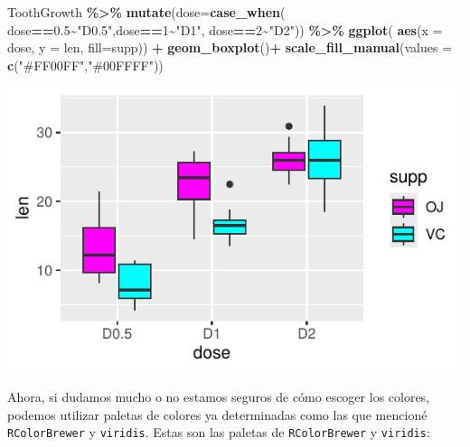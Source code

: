 \documentclass[
]{book}
\newenvironment{Shaded}{\begin{snugshade}}{\end{snugshade}}
\newcommand{\AttributeTok}[1]{\textcolor[rgb]{0.13,0.29,0.53}{#1}}
\newcommand{\DecValTok}[1]{\textcolor[rgb]{0.00,0.00,0.81}{#1}}
\newcommand{\FloatTok}[1]{\textcolor[rgb]{0.00,0.00,0.81}{#1}}
\newcommand{\FunctionTok}[1]{\textcolor[rgb]{0.13,0.29,0.53}{\textbf{#1}}}
\newcommand{\NormalTok}[1]{#1}
\newcommand{\SpecialCharTok}[1]{\textcolor[rgb]{0.81,0.36,0.00}{\textbf{#1}}}
\newcommand{\StringTok}[1]{\textcolor[rgb]{0.31,0.60,0.02}{#1}}
\begin{document}
\begin{Shaded}
\begin{Highlighting}[]
\NormalTok{ToothGrowth }\SpecialCharTok{\%\textgreater{}\%}  \FunctionTok{mutate}\NormalTok{(}\AttributeTok{dose=}\FunctionTok{case\_when}\NormalTok{(}
\NormalTok{  dose}\SpecialCharTok{==}\FloatTok{0.5}\SpecialCharTok{\textasciitilde{}}\StringTok{"D0.5"}\NormalTok{,dose}\SpecialCharTok{==}\DecValTok{1}\SpecialCharTok{\textasciitilde{}}\StringTok{"D1"}\NormalTok{, dose}\SpecialCharTok{==}\DecValTok{2}\SpecialCharTok{\textasciitilde{}}\StringTok{"D2"}\NormalTok{)) }\SpecialCharTok{\%\textgreater{}\%} \FunctionTok{ggplot}\NormalTok{(}
    \FunctionTok{aes}\NormalTok{(}\AttributeTok{x =}\NormalTok{ dose, }\AttributeTok{y =}\NormalTok{ len, }\AttributeTok{fill=}\NormalTok{supp)) }\SpecialCharTok{+}  \FunctionTok{geom\_boxplot}\NormalTok{()}\SpecialCharTok{+}
  \FunctionTok{scale\_fill\_manual}\NormalTok{(}\AttributeTok{values =} \FunctionTok{c}\NormalTok{(}\StringTok{"\#FF00FF"}\NormalTok{,}\StringTok{"\#00FFFF"}\NormalTok{))}
\end{Highlighting}
\end{Shaded}

\begin{center}\includegraphics{_main_files/figure-latex/unnamed-chunk-213-1} \end{center}

\hfill\break
Ahora, si dudamos mucho o no estamos seguros de cómo escoger los colores, podemos utilizar paletas de colores ya determinadas como las que mencioné \texttt{RColorBrewer} y \texttt{viridis}. Estas son las paletas de \texttt{RColorBrewer} y \texttt{viridis}:
\end{document}
